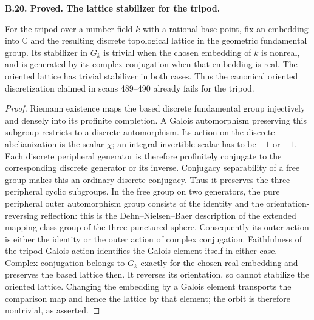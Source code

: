 \documentclass[11pt,oneside]{article}
\makeatletter
\newcounter{statementanchor}
\newenvironment{statement}[3]{%
 \refstepcounter{statementanchor}\def\@currentlabel{#1}%
 \par\addvspace{9pt}\noindent
 \textbf{#1. #2. #3.}\par\nobreak\noindent\ignorespaces
}{\par\addvspace{5pt}}
\makeatother
\begin{document}
\begin{statement}{B.20}{Proved}{The lattice stabilizer for the tripod}
\label{st:B.20}

For the tripod over a number field $k$ with a rational base point,
fix an embedding into $\mathbb C$ and the resulting discrete
topological lattice in the geometric fundamental group.  Its
stabilizer in $G_k$ is trivial when the chosen embedding of $k$ is
nonreal, and is generated by its complex conjugation when that
embedding is real.  The oriented lattice has trivial stabilizer
in both cases.  Thus the canonical oriented discretization claimed
in scans 489--490 already fails for the tripod.
\end{statement}
\begin{proof}
Riemann existence maps the based discrete fundamental group injectively
and densely into its profinite completion.  A Galois automorphism
preserving this subgroup restricts to a discrete automorphism.
Its action on the discrete abelianization is the scalar $\chi$;
an integral invertible scalar has to be $+1$ or $-1$.  Each discrete
peripheral generator is therefore profinitely conjugate to the
corresponding discrete generator or its inverse.  Conjugacy
separability of a free group makes this an ordinary discrete
conjugacy.  Thus it preserves the three peripheral cyclic subgroups.
In the free group on two generators,
the pure peripheral outer automorphism group consists of the
identity and the orientation-reversing reflection: this is the
Dehn--Nielsen--Baer description of the extended mapping class group
of the three-punctured sphere.  Consequently its outer action is
either the identity or the outer action of complex conjugation.
Faithfulness of the tripod Galois action identifies the Galois
element itself in either case.  Complex conjugation belongs to
$G_k$ exactly for the chosen real embedding and preserves the based
lattice then.  It reverses its orientation, so cannot stabilize the
oriented lattice.  Changing the embedding by a Galois element
transports the comparison map and hence the lattice by that element;
the orbit is therefore nontrivial, as asserted.
\end{proof}
\end{document}
